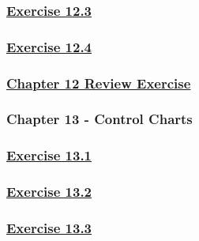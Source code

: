 \documentclass[
  11pt,
]{book}
\begin{document}
\subsubsection*{\texorpdfstring{\hyperref[ex123q]{Exercise 12.3}}{Exercise 12.3}}\label{exercise-12.3-1}

\subsubsection*{\texorpdfstring{\hyperref[ex124q]{Exercise 12.4}}{Exercise 12.4}}\label{exercise-12.4-1}

\subsubsection*{\texorpdfstring{\hyperref[re12q]{Chapter 12 Review Exercise}}{Chapter 12 Review Exercise}}\label{chapter-12-review-exercise}

\subsubsection*{Chapter 13 - Control Charts}\label{chapter-13---control-charts}

\subsubsection*{\texorpdfstring{\hyperref[ex131q]{Exercise 13.1}}{Exercise 13.1}}\label{exercise-13.1-1}

\subsubsection*{\texorpdfstring{\hyperref[ex132q]{Exercise 13.2}}{Exercise 13.2}}\label{exercise-13.2-1}

\subsubsection*{\texorpdfstring{\hyperref[ex133q]{Exercise 13.3}}{Exercise 13.3}}\label{exercise-13.3-1}
\end{document}
